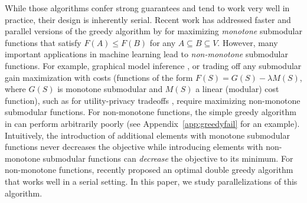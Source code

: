 \documentclass{article} %
\newcommand{\Comments}{1}
\newcommand{\note}[2]{\ifnum\Comments=1\textcolor{#1}{#2}\fi}
\newcommand{\joey}[1]{\note{blue}{[JG: #1]}}
\begin{document}
While those algorithms confer strong guarantees and tend to work very well in practice, their design is inherently serial.
%
Recent work has addressed faster \cite{badan14,wei14} and parallel \cite{Mirzasoleiman2013,kumar13} versions of the greedy algorithm by \citet{nemhauser1978} for maximizing \emph{monotone} submodular functions that satisfy $F(A) \leq F(B)$ for any $A \subseteq B \subseteq V$.
However, many important applications in machine learning lead to \emph{non-monotone} submodular functions.
For example, graphical model inference \cite{gillenwater12,reed13}, or trading off any submodular gain maximization with costs (functions of the form $F(S) = G(S) - \lambda M(S)$, where $G(S)$ is monotone submodular and $M(S)$ a linear (modular) cost function), such as for utility-privacy tradeoffs \cite{krause10priv}, 
 require maximizing non-monotone submodular functions.
For non-monotone functions, the simple greedy algorithm in \cite{nemhauser1978} can perform arbitrarily poorly (see Appendix~\ref{app:greedyfail} for an example).
Intuitively, the introduction of additional elements with monotone submodular functions never decreases the objective while introducing elements with non-monotone submodular functions can \emph{decrease} the objective to its minimum.
For non-monotone functions, \citet{buchbinder2012} recently proposed an optimal double greedy algorithm that works well in a serial setting. In this paper, we study parallelizations of this algorithm.

\end{document}
